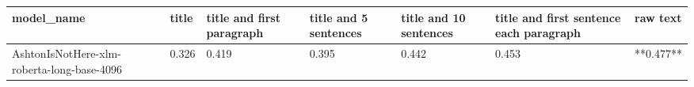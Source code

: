 \begin{tabular}{lllllll}
\toprule
                                model\_name & title & title and first paragraph & title and 5 sentences & title and 10 sentences & title and first sentence each paragraph &  raw text \\
\midrule
AshtonIsNotHere-xlm-roberta-long-base-4096 & 0.326 &                     0.419 &                 0.395 &                  0.442 &                                   0.453 & **0.477** \\
\bottomrule
\end{tabular}
